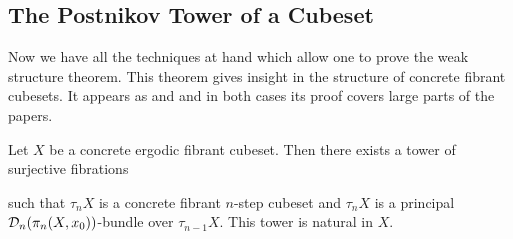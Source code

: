 \subsection{The Postnikov Tower of a Cubeset}\label{ssec:postnikov}

Now we have all the techniques at hand which allow one to prove the weak structure theorem.
This theorem gives insight in the structure of concrete fibrant cubesets.
It appears as \cite[Theorem 3.2.19]{Candela2017} and \cite[Corollary 7.20]{Gutman2020}
and in both cases its proof covers large parts of the papers.

\begin{theorem}\label{thm:weak-structure}
Let $X$ be a concrete ergodic fibrant cubeset.
Then there exists a tower of surjective fibrations
\begin{center}
\end{center}
such that $\tau_n X$ is a concrete fibrant $n$-step cubeset
and $\tau_n X$ is a principal $\mathcal{D}_n(\pi_n(X,x_0))$-bundle over $\tau_{n-1} X$.
This tower is natural in $X$.
\end{theorem}

